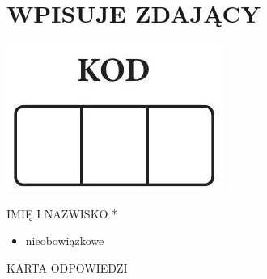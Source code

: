 \documentclass[10pt]{article}
\begin{document}
\section*{WPISUJE ZDAJĄCY}
\begin{center}
\includegraphics[max width=\textwidth]{2024_11_21_1e89351873aa60c4c1b9g-23(1)}
\end{center}

IMIĘ I NAZWISKO *

\begin{itemize}
  \item nieobowiązkowe
\end{itemize}

KARTA ODPOWIEDZI
\end{document}
